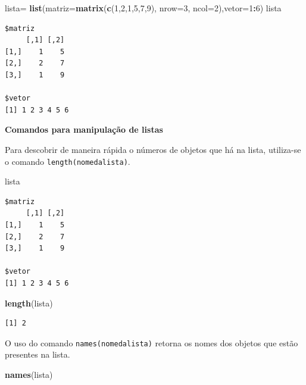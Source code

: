 \documentclass[12pt,brazil,oneside]{book}
\newenvironment{Shaded}{\begin{snugshade}}{\end{snugshade}}
\newcommand{\DataTypeTok}[1]{\textcolor[rgb]{0.13,0.29,0.53}{#1}}
\newcommand{\DecValTok}[1]{\textcolor[rgb]{0.00,0.00,0.81}{#1}}
\newcommand{\KeywordTok}[1]{\textcolor[rgb]{0.13,0.29,0.53}{\textbf{#1}}}
\newcommand{\NormalTok}[1]{#1}
\newcommand{\OperatorTok}[1]{\textcolor[rgb]{0.81,0.36,0.00}{\textbf{#1}}}
\newcommand{\StringTok}[1]{\textcolor[rgb]{0.31,0.60,0.02}{#1}}
\begin{document}
\begin{Shaded}
\begin{Highlighting}[]
\NormalTok{lista=}\StringTok{ }\KeywordTok{list}\NormalTok{(}\DataTypeTok{matriz=}\KeywordTok{matrix}\NormalTok{(}\KeywordTok{c}\NormalTok{(}\DecValTok{1}\NormalTok{,}\DecValTok{2}\NormalTok{,}\DecValTok{1}\NormalTok{,}\DecValTok{5}\NormalTok{,}\DecValTok{7}\NormalTok{,}\DecValTok{9}\NormalTok{), }\DataTypeTok{nrow=}\DecValTok{3}\NormalTok{, }\DataTypeTok{ncol=}\DecValTok{2}\NormalTok{),}\DataTypeTok{vetor=}\DecValTok{1}\OperatorTok{:}\DecValTok{6}\NormalTok{)}
\NormalTok{lista}
\end{Highlighting}
\end{Shaded}

\begin{verbatim}
$matriz
     [,1] [,2]
[1,]    1    5
[2,]    2    7
[3,]    1    9

$vetor
[1] 1 2 3 4 5 6
\end{verbatim}

\textbf{Comandos para manipulação de listas}

Para descobrir de maneira rápida o números de objetos que há na lista, utiliza-se o comando \texttt{length(nomedalista)}.

\begin{Shaded}
\begin{Highlighting}[]
\NormalTok{lista}
\end{Highlighting}
\end{Shaded}

\begin{verbatim}
$matriz
     [,1] [,2]
[1,]    1    5
[2,]    2    7
[3,]    1    9

$vetor
[1] 1 2 3 4 5 6
\end{verbatim}

\begin{Shaded}
\begin{Highlighting}[]
\KeywordTok{length}\NormalTok{(lista)}
\end{Highlighting}
\end{Shaded}

\begin{verbatim}
[1] 2
\end{verbatim}

O uso do comando \texttt{names(nomedalista)} retorna os nomes dos objetos que estão presentes na lista.

\begin{Shaded}
\begin{Highlighting}[]
\KeywordTok{names}\NormalTok{(lista)}
\end{Highlighting}
\end{Shaded}
\end{document}
